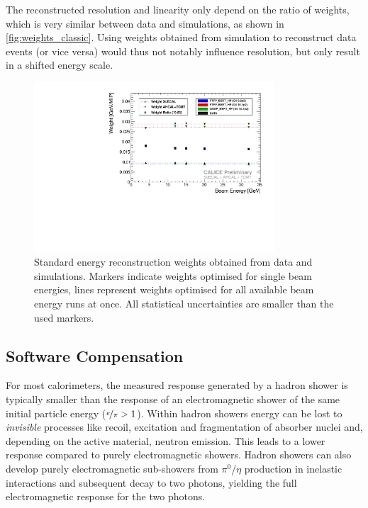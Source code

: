 \documentclass[twoside,a4paper,12pt]{article}
\begin{document}
The reconstructed resolution and linearity only depend on the ratio of weights, which is very similar between data and simulations, as shown in \autoref{fig:weights_classic}. Using weights obtained from simulation to reconstruct data events (or vice versa) would thus not notably influence resolution, but only result in a shifted energy scale. 
\begin{figure}[htbp]
\begin{center}
\includegraphics[width=0.8\textwidth,page=1]{fig/pion/classic/weightsClassic.pdf}
\caption{Standard energy reconstruction weights obtained from data and simulations. Markers indicate weights optimised for single beam energies, lines represent weights optimised for all available beam energy runs at once. All statistical uncertainties are smaller than the used markers.}
\label{fig:weights_classic}
\end{center}
\end{figure}
\subsection{Software Compensation}\label{sec:energyrecosc}
For most calorimeters, the measured response generated by a hadron shower is typically smaller than the response of an electromagnetic shower of the same initial particle energy ($\nicefrac{e}{\pi}>1$). Within hadron showers energy can be lost to \emph{invisible} processes like recoil, excitation and fragmentation of absorber nuclei and, depending on the active material, neutron emission. This leads to a lower response compared to purely electromagnetic showers. Hadron showers can also develop purely electromagnetic sub-showers from $\pi^0$/$\eta$ production in inelastic interactions and subsequent decay to two photons, yielding the full electromagnetic response for the two photons. 
\end{document}
